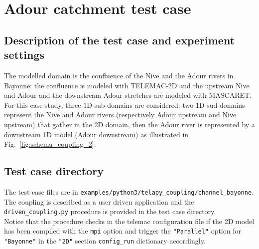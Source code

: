 \documentclass[Coupling]{../../data/TelemacDoc} %
\begin{document}
\section{Adour catchment test case}
\subsection{Description of the test case and experiment settings}
The modelled domain is the confluence of the Nive and the Adour rivers
in Bayonne: the confluence is modeled with TELEMAC-2D and the upstream
Nive and Adour and the downstream Adour stretches are modeled with
MASCARET. For this case study, three 1D sub-domains are considered:
two 1D sud-domains represent the Nive and Adour rivers (respectively
Adour upstream and Nive upstream) that gather in the 2D domain, then
the Adour river is represented by a downstream 1D model (Adour
downstream) as illustrated in Fig.~\ref{fig:schema_coupling_2}. 

\subsection{Test case directory}
The test case files are in 
\texttt{examples/python3/telapy\_coupling/channel\_bayonne}.\\

The coupling is described as a user driven application and the
\texttt{driven\_coupling.py} procedure is provided in the test case
directory.\\
Notice that the procedure checks in the telemac configuration file if
the 2D model has been compiled with the \texttt{mpi} option and
trigger the \texttt{"Parallel"} option for \texttt{"Bayonne"} in the
\texttt{"2D"} section  \texttt{config\_run} dictionary accordingly.\\
\end{document}
